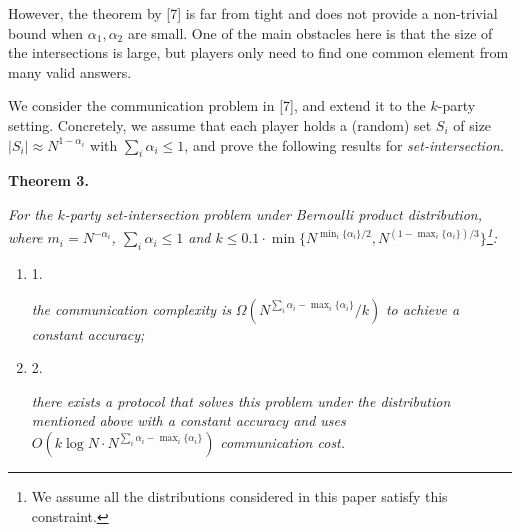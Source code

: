 However, the theorem by [7] is far from tight and does not provide a non-trivial bound when $\alpha_{1},\alpha_{2}$ are small. One of the main obstacles here is that the size of the intersections is large, but players only need to find one common element from many valid answers.\par




We consider the communication problem in [7], and extend it to the $k$-party setting. Concretely, we assume that each player holds a (random) set $S_{i}$ of size $|S_{i}|\approx N^{1-\alpha_{i}}$ with $\sum_{i}\alpha_{i}\leq 1$, and prove the following results for \emph{set-intersection}.\par





\par\medskip\noindent\textbf{
\textbf{Theorem 3}\textbf{.}
}\par



\emph{For the $k$-party set-intersection problem under Bernoulli product distribution, where $m_{i}=N^{-\alpha_{i}}$, $\sum_{i}\alpha_{i}\leq 1$ and $k\leq 0.1\cdot\min\{N^{\min_{i}\{\alpha_{i}\}/2},N^{(1-\max_{i}\{\alpha_{i}\})/3}\}$\footnote{We assume all the distributions considered in this paper satisfy this constraint.}:}\par


\begin{enumerate}


\item[] 
1. 


\emph{the communication complexity is }$\Omega\left(N^{\sum_{i}\alpha_{i}-\mathop{\max}_{i}\{\alpha_{i}\}}/k\right)$\emph{ to achieve a constant accuracy;}\par





\item[] 
2. 


\emph{there exists a protocol that solves this problem under the distribution mentioned above with a constant accuracy and uses }$O\left(k\log N\cdot N^{\sum_{i}\alpha_{i}-\mathop{\max}_{i}\{\alpha_{i}\}}\right)$\emph{ communication cost.}\par





\end{enumerate}




